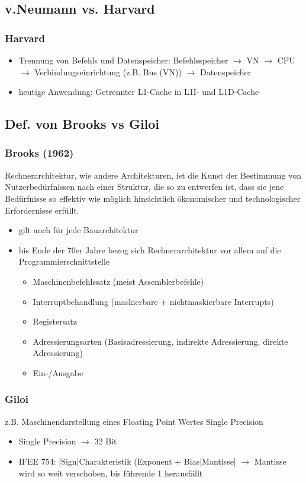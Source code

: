 \subsection{v.Neumann vs. Harvard}
\subsubsection{Harvard}
\begin{itemize}
	\item Trennung von Befehls und Datenspeicher: Befehlsspeicher \(\to\) VN \(\to\) CPU \(\to\) Verbindungseinrichtung (z.B. Bus (VN)) \(\to\) Datenspeicher
	\item heutige Anwendung: Getrennter L1-Cache in L1I- und L1D-Cache
\end{itemize}
\subsection{Def. von Brooks vs Giloi}
\subsubsection{Brooks (1962)}
Rechnerarchitektur, wie andere Architekturen, ist die Kunst der Bestimmung von Nutzerbedürfnissen nach einer Struktur, die so zu entwerfen ist, dass sie jene Bedürfnisse so effektiv wie möglich hinsichtlich ökonomischer und technologischer Erfordernisse erfüllt.
\begin{itemize}
	\item gilt auch für jede Bauarchitektur
	\item bis Ende der 70er Jahre bezog sich Rechnerarchitektur vor allem auf die Programmierschnittstelle 
	\begin{itemize}
		\item Maschinenbefehlssatz (meist Assemblerbefehle) 
		\item Interruptbehandlung (maskierbare + nichtmaskierbare Interrupts)
		\item Registersatz
		\item Adressierungsarten (Basisadressierung, indirekte Adressierung, direkte Adressierung)
		\item Ein-/Ausgabe
	\end{itemize}
\end{itemize}
\subsubsection{Giloi}
z.B. Maschinendarstellung eines Floating Point Wertes Single Precision
\begin{itemize}
	\item Single Precision \(\to\) 32 Bit
	\item IFEE 754: |Sign|Charakteristik (Exponent + Bias|Mantisse| \(\to\) Mantisse wird so weit verschoben, bis führende 1 herausfällt
\end{itemize}
